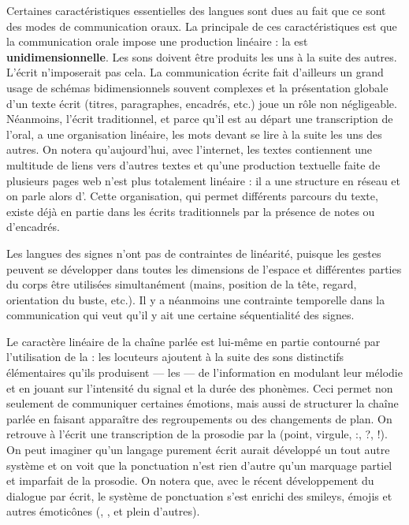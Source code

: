 Certaines caractéristiques essentielles des langues sont dues au fait que ce sont des modes de communication oraux. La principale de ces caractéristiques est que la communication orale impose une production linéaire : la  est \textbf{unidimensionnelle}. Les sons doivent être produits les uns à la suite des autres. L’écrit n’imposerait pas cela. La communication écrite fait d’ailleurs un grand usage de schémas bidimensionnels souvent complexes et la présentation globale d’un texte écrit (titres, paragraphes, encadrés, etc.) joue un rôle non négligeable. Néanmoins, l’écrit traditionnel, et parce qu’il est au départ une transcription de l’oral, a une organisation linéaire, les mots devant se lire à la suite les uns des autres. On notera qu’aujourd’hui, avec l’internet, les textes contiennent une multitude de liens vers d’autres textes et qu’une production textuelle faite de plusieurs pages web n’est plus totalement linéaire : il a une structure en réseau et on parle alors d’. Cette organisation, qui permet différents parcours du texte, existe déjà en partie dans les écrits traditionnels par la présence de notes ou d’encadrés.

Les langues des signes n’ont pas de contraintes de linéarité, puisque les gestes peuvent se développer dans toutes les dimensions de l’espace et différentes parties du corps être utilisées simultanément (mains, position de la tête, regard, orientation du buste, etc.). Il y a néanmoins une contrainte temporelle dans la communication qui veut qu’il y ait une certaine séquentialité des signes.

Le caractère linéaire de la chaîne parlée est lui-même en partie contourné par l’utilisation de la : les locuteurs ajoutent à la suite des sons distinctifs élémentaires qu’ils produisent — les  — de l’information en modulant leur mélodie et en jouant sur l’intensité du signal et la durée des phonèmes. Ceci permet non seulement de communiquer certaines émotions, mais aussi de structurer la chaîne parlée en faisant apparaître des regroupements ou des changements de plan. On retrouve à l’écrit une transcription de la prosodie par la  (point, virgule, :, ?, !).  On peut imaginer qu’un langage purement écrit aurait développé un tout autre système et on voit que la ponctuation n’est rien d’autre qu’un marquage partiel et imparfait de la prosodie. On notera que, avec le récent développement du dialogue par écrit, le système de ponctuation s’est enrichi des smileys, émojis et autres émoticônes (\HappySmiley{}, \SadSmiley{}, et plein d’autres).


